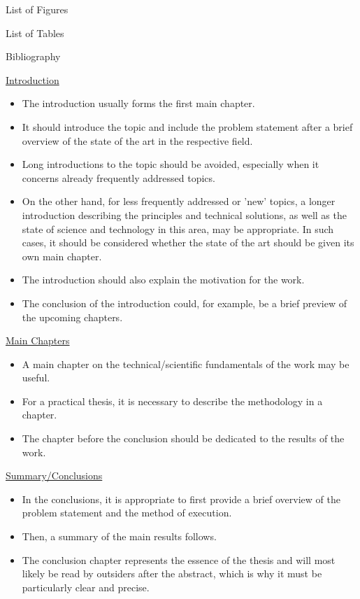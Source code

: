 \documentclass[a4paper, fleqn, headsepline, footsepline, 12pt, parskip=half]{scrartcl}
\begin{document}
\vspace{1mm}
\hspace{5mm}
List of Figures

\vspace{1mm}
\hspace{5mm}
List of Tables

\vspace{1mm}
\hspace{5mm}
Bibliography

\vspace{5mm}
\underline{Introduction}

\begin{itemize}
    \item The introduction usually forms the first main chapter.
    \item It should introduce the topic and include the problem statement after a brief overview of the state of the art in the respective field.
    \item Long introductions to the topic should be avoided, especially when it concerns already frequently addressed topics.
    \item On the other hand, for less frequently addressed or 'new' topics, a longer introduction describing the principles and technical solutions, as well as the state of science and technology in this area, may be appropriate. In such cases, it should be considered whether the state of the art should be given its own main chapter.
    \item The introduction should also explain the motivation for the work.
    \item The conclusion of the introduction could, for example, be a brief preview of the upcoming chapters.
\end{itemize}

\underline{Main Chapters}

\begin{itemize}
    \item A main chapter on the technical/scientific fundamentals of the work may be useful.
    \item For a practical thesis, it is necessary to describe the methodology in a chapter.
    \item The chapter before the conclusion should be dedicated to the results of the work.
\end{itemize}

\underline{Summary/Conclusions}

\begin{itemize}
    \item In the conclusions, it is appropriate to first provide a brief overview of the problem statement and the method of execution.
    \item Then, a summary of the main results follows.
    \item The conclusion chapter represents the essence of the thesis and will most likely be read by outsiders after the abstract, which is why it must be particularly clear and precise.
\end{itemize}
\end{document}
